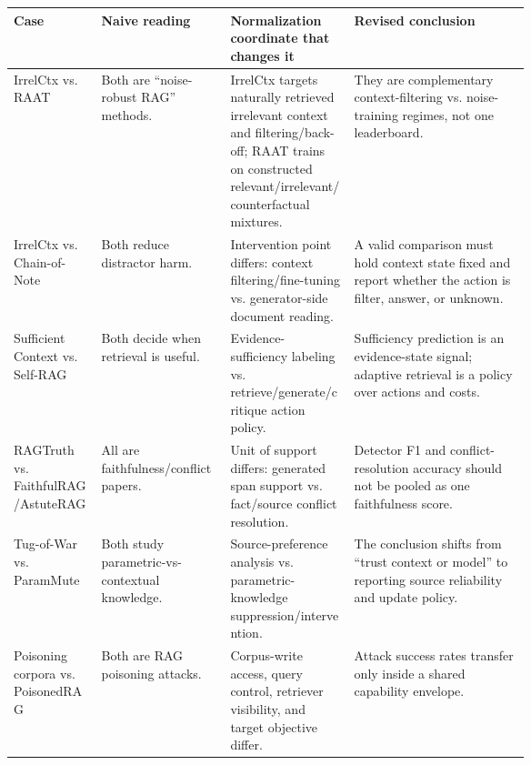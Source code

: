 \documentclass[11pt]{article}
\begin{document}
\begin{table}[t]
\centering
\scriptsize
\renewcommand{\arraystretch}{0.82}
\begin{tabularx}{\linewidth}{>{\raggedright\arraybackslash}p{0.17\linewidth}>{\raggedright\arraybackslash}p{0.25\linewidth}>{\raggedright\arraybackslash}p{0.24\linewidth}X}
\toprule
\textbf{Case} & \textbf{Naive reading} & \textbf{Normalization coordinate that changes it} & \textbf{Revised conclusion} \\
\midrule
IrrelCtx \citep{irrelevantContext2023} vs. RAAT \citep{raat2024} & Both are ``noise-robust RAG'' methods. & IrrelCtx targets naturally retrieved irrelevant context and filtering/back-off; RAAT trains on constructed relevant/irrelevant/counterfactual mixtures. & They are complementary context-filtering vs. noise-training regimes, not one leaderboard. \\
IrrelCtx \citep{irrelevantContext2023} vs. Chain-of-Note \citep{chainOfNote2023} & Both reduce distractor harm. & Intervention point differs: context filtering/fine-tuning vs. generator-side document reading. & A valid comparison must hold context state fixed and report whether the action is filter, answer, or unknown. \\
Sufficient Context \citep{sufficientContext2024} vs. Self-RAG \citep{selfRAG2023} & Both decide when retrieval is useful. & Evidence-sufficiency labeling vs. retrieve/generate/critique action policy. & Sufficiency prediction is an evidence-state signal; adaptive retrieval is a policy over actions and costs. \\
RAGTruth \citep{ragTruth2024} vs. FaithfulRAG/AstuteRAG \citep{faithfulRAG2025,astuteRAG2025} & All are faithfulness/conflict papers. & Unit of support differs: generated span support vs. fact/source conflict resolution. & Detector F1 and conflict-resolution accuracy should not be pooled as one faithfulness score. \\
Tug-of-War \citep{tugOfWar2024} vs. ParamMute \citep{rrag024} & Both study parametric-vs-contextual knowledge. & Source-preference analysis vs. parametric-knowledge suppression/intervention. & The conclusion shifts from ``trust context or model'' to reporting source reliability and update policy. \\
Poisoning corpora \citep{poisoningRetrievalCorpora2023} vs. PoisonedRAG \citep{poisonedRAG2024} & Both are RAG poisoning attacks. & Corpus-write access, query control, retriever visibility, and target objective differ. & Attack success rates transfer only inside a shared capability envelope. \\

\end{tabularx}
\end{table}
\end{document}
